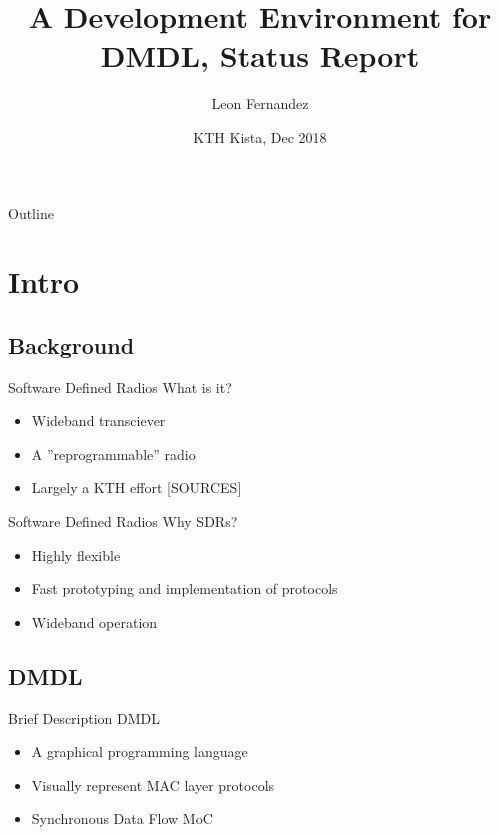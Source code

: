 \documentclass{beamer}
\title[ID2205 Status Report] %
{A Development Environment for DMDL, Status Report}
\author{Leon Fernandez}
\date{KTH Kista, Dec 2018}
\begin{document}
\begin{frame}
 	\titlepage
\end{frame}

\begin{frame}{Outline}
 	\tableofcontents
\end{frame}

\section{Intro}

\subsection{Background}

\begin{frame}{Software Defined Radios}
	What is it?
	\begin{itemize}
		\item<2-> Wideband transciever
		\item<3-> A ''reprogrammable'' radio
		\item<4-> Largely a KTH effort [SOURCES]
	\end{itemize}
\end{frame}

\begin{frame}{Software Defined Radios}
	Why SDRs?	
	\begin{itemize}
		\item<2-> Highly flexible
		\item<3-> Fast prototyping and implementation of protocols
		\item<4-> Wideband operation
	\end{itemize}
\end{frame}


\subsection{DMDL}
\begin{frame}{Brief Description}
	DMDL
	\begin{itemize}
		\item<2-> A graphical programming language
		\item<3-> Visually represent MAC layer protocols
		\item<4-> Synchronous Data Flow MoC
	\end{itemize}

\end{frame}
\end{document}
